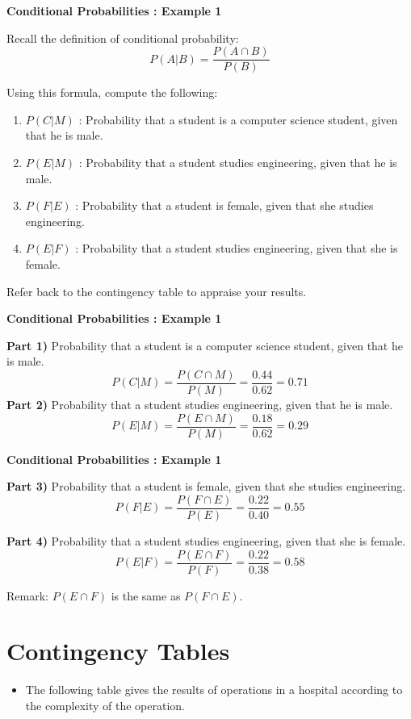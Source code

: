 {
	\noindent \textbf{Conditional Probabilities : Example 1}
	
	Recall the definition of conditional probability:
	\[ P(A|B) = \frac{P(A \cap B)}{P(B)} \]
	
	Using this formula, compute the following:
	\begin{enumerate}
		\item $P(C|M)$ : Probability that a student is a computer science student, given that he is male.
		\item $P(E|M)$ : Probability that a student studies engineering, given that he is male.
		\item $P(F|E)$ : Probability that a student is female, given that she studies engineering.
		\item $P(E|F)$ : Probability that a student studies engineering, given that she is female.
	\end{enumerate}
	Refer back to the contingency table to appraise your results.
}
{
	\noindent \textbf{Conditional Probabilities : Example 1}
	
	\textbf{Part 1)} Probability that a student is a computer science student, given that he is male.
	\[ P(C|M) = \frac{P(C \cap M)}{P(M)}  = \frac{0.44}{0.62} = 0.71 \]
	\textbf{Part 2)} Probability that a student studies engineering, given that he is male.
	\[ P(E|M) = \frac{P(E \cap M)}{P(M)}  = \frac{0.18}{0.62} = 0.29 \]
	
}

{
	\noindent \textbf{Conditional Probabilities : Example 1}
	
	\textbf{Part 3)} Probability that a student is female, given that she studies engineering.
	\[ P(F|E) = \frac{P(F \cap E)}{P(E)}  = \frac{0.22}{0.40} = 0.55 \]
	
	\textbf{Part 4)} Probability that a student studies engineering, given that she is female.
	\[ P(E|F) = \frac{P(E \cap F)}{P(F)}  = \frac{0.22}{0.38} = 0.58 \]
	
	
	Remark: $P(E \cap F)$ is the same as $P(F \cap E)$.
	
	
}

\section{Contingency Tables}

\begin{itemize}
				\item The following table gives the results of operations in a hospital according to the complexity of the
				operation.
			\end{itemize}
			
